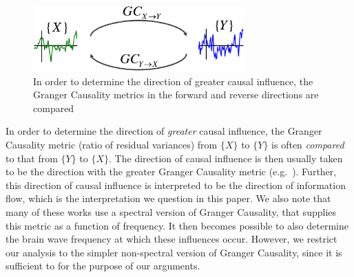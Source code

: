 \documentclass[letterpaper, 10pt, conference]{ieeeconf}
\begin{document}

\begin{figure}[htbp] %
	\centering
	\includegraphics[width=3.2in]{gc-comparison}
	\caption{In order to determine the direction of greater causal influence, the Granger Causality metrics in the forward and reverse directions are compared}
	\label{fig:gc-comparison}
\end{figure}

In order to determine the direction of \emph{greater} causal influence, the Granger Causality metric (ratio of residual variances) from $\{X\}$ to $\{Y\}$ is often \emph{compared} to that from $\{Y\}$ to $\{X\}$. The direction of causal influence is then usually taken to be the direction with the greater Granger Causality metric (e.g.~\cite{Brovelli2004BetaOscillations,jiao2013universal}). Further, this direction of causal influence is interpreted to be the direction of information flow, which is the interpretation we question in this paper. We also note that many of these works use a spectral version of Granger Causality, that supplies this metric as a function of frequency. It then becomes possible to also determine the brain wave frequency at which these influences occur. However, we restrict our analysis to the simpler non-spectral version of Granger Causality, since it is sufficient to for the purpose of our arguments.
\end{document}
